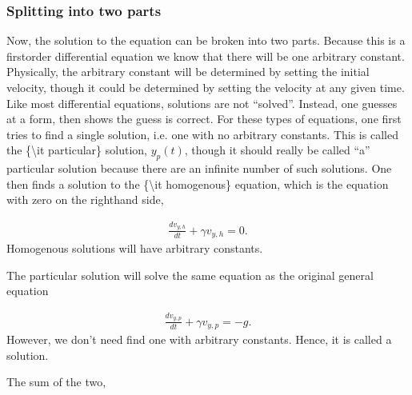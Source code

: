\documentclass[letterpaper,10pt,english]{sphinxmanual}
\begin{document}
\subsubsection{Splitting into two parts}
\label{\detokenize{chapter3:splitting-into-two-parts}}
Now, the solution to the equation can be broken into two
parts. Because this is a first\sphinxhyphen{}order differential equation we know
that there will be one arbitrary constant. Physically, the arbitrary
constant will be determined by setting the initial velocity, though it
could be determined by setting the velocity at any given time. Like
most differential equations, solutions are not “solved”. Instead,
one guesses at a form, then shows the guess is correct. For these
types of equations, one first tries to find a single solution,
i.e. one with no arbitrary constants. This is called the \{\textbackslash{}it
particular\} solution, \(y_p(t)\), though it should really be called
“a” particular solution because there are an infinite number of such
solutions. One then finds a solution to the \{\textbackslash{}it homogenous\} equation,
which is the equation with zero on the right\sphinxhyphen{}hand side,




\begin{equation*}
\begin{split}
\begin{equation}
\frac{dv_{y,h}}{dt}+\gamma v_{y,h}=0.
\label{_auto7} \tag{7}
\end{equation}
\end{split}
\end{equation*}
Homogenous solutions will have arbitrary constants.

The particular solution will solve the same equation as the original
general equation




\begin{equation*}
\begin{split}
\begin{equation}
\frac{dv_{y,p}}{dt}+\gamma v_{y,p}=-g.
\label{_auto8} \tag{8}
\end{equation}
\end{split}
\end{equation*}
However, we don’t need find one with arbitrary constants. Hence, it is
called a  solution.

The sum of the two,
\end{document}
